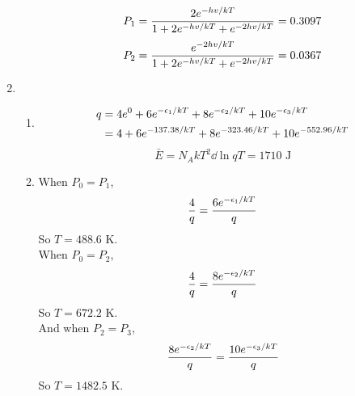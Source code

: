 \begin{solution}
\begin{enumerate}
\begin{enumerate}
\begin{equation*}
                            P_1=\frac{2e^{-hv/kT}}{1+2e^{-hv/kT}+e^{-2hv/kT}}=0.3097
                        \end{equation*}
                        \begin{equation*}
                            P_2=\frac{e^{-2hv/kT}}{1+2e^{-hv/kT}+e^{-2hv/kT}}=0.0367
                        \end{equation*}
              \end{enumerate}
        \item \begin{enumerate}
                  \item \begin{equation*}
                            \begin{aligned}
                                q & =4e^0+6e^{-\epsilon_1/kT}+8e^{-\epsilon_2/kT}+10e^{-\epsilon_3/kT} \\
                                  & =4+6e^{-137.38/kT}+8e^{-323.46/kT}+10e^{-552.96/kT}
                            \end{aligned}
                        \end{equation*}
                        \begin{equation*}
                            \bar{E}=N_AkT^2\dd{\ln q}{T}=1710\text{ J}
                        \end{equation*}
                  \item When $P_0=P_1$,
                        \begin{equation*}
                            \frac{4}{q}=\frac{6e^{-\epsilon_1/kT}}{q}
                        \end{equation*}
                        So $T=488.6$ K.\\
                        When $P_0=P_2$,
                        \begin{equation*}
                            \frac{4}{q}=\frac{8e^{-\epsilon_2/kT}}{q}
                        \end{equation*}
                        So $T=672.2$ K.\\
                        And when $P_2=P_3$,
                        \begin{equation*}
                            \frac{8e^{-\epsilon_2/kT}}{q}=\frac{10e^{-\epsilon_3/kT}}{q}
                        \end{equation*}
                        So $T=1482.5$ K.
              \end{enumerate}
    \end{enumerate}
\end{solution}

